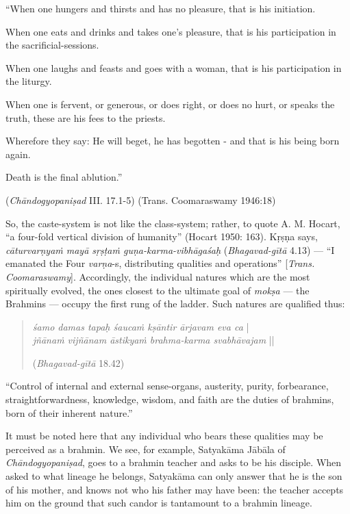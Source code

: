 \begin{myquote}
“When one hungers and thirsts and has no pleasure, that is his initiation. 

When one eats and drinks and takes one’s pleasure, that is his participation in the sacrificial-sessions. 

When one laughs and feasts and goes with a woman, that is his participation in the liturgy. 

When one is fervent, or generous, or does right, or does no hurt, or speaks the truth, these are his fees to the priests. 

Wherefore they say: He will beget, he has begotten - and that is his being born again. 

Death is the final ablution.” 

\hfill({\sl Chāndogyopaniṣad} III. 17.1-5) (Trans. Coomaraswamy 1946:18) 
\end{myquote}

So, the caste-system is not like the class-system; rather, to quote A. M. Hocart, “a four-fold vertical division of humanity” (Hocart 1950: 163). Kṛṣṇa says, {\sl cāturvarṇyaṁ mayā sṛṣṭaṁ guṇa-karma-vibhāgaśaḥ} ({\sl Bhagavad-gītā} 4.13) --- ``I emanated the Four {\sl varṇa}-s, distributing qualities and operations'' [{\sl Trans. Coomaraswamy}]. Accordingly, the individual natures which are the most spiritually evolved, the ones closest to the ultimate goal of {\sl mokṣa} --- the Brahmins --- occupy the first rung of the ladder. Such natures are qualified thus:
\begin{quote}
{{\sl śamo damas tapaḥ śaucaṁ kṣāntir ārjavam eva ca}} |\\
{\sl jñānaṁ vijñānam āstikyaṁ brahma-karma svabhāvajam} || 

\hfill ({\sl Bhagavad-gītā} 18.42)
\end{quote}

\begin{myquote}
“Control of internal and external sense-organs, austerity, purity, forbearance, straightforwardness, knowledge, wisdom, and faith are the duties of brahmins, born of their inherent nature.”
\end{myquote}

It must be noted here that any individual who bears these qualities may be perceived as a brahmin. We see, for example, Satyakāma Jābāla of {\sl Chāndogyopaniṣad}, goes to a brahmin teacher and asks to be his disciple. When asked to what lineage he belongs, Satyakāma can only answer that he is the son of his mother, and knows not who his father may have been: the teacher accepts him on the ground that such candor is tantamount to a brahmin lineage. 

